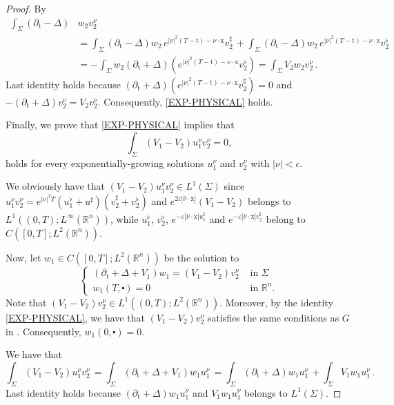 \documentclass[10pt,a4paper]{amsart}
\theoremstyle{remark}
\theoremstyle{definition}
\newcommand{\R}{\mathbb{R}}
\newcommand{\tm}{\mathrm{t}}
\newcommand{\x}{\mathrm{x}}
\begin{document}
\begin{proof}
By 
\begin{align*}
\int_{\Sigma}\left( \partial_{\tm}-\Delta\right)& w_{2} v_{2}^{\nu} \, \\
& = \int_{\Sigma}\left( \partial_{\tm}-\Delta\right) w_{2} \, e^{|\nu|^2 (T - \tm) - \nu \cdot \x} v_2^\sharp \, + \int_{\Sigma}\left( \partial_{\tm}-\Delta\right) w_{2} \, e^{|\nu|^2 (T - \tm) - \nu \cdot \x} v_2^\flat \, \\
& = - \int_{\Sigma} w_2 \left( \partial_{\tm}+\Delta\right)(e^{|\nu|^2 (T - \tm) - \nu \cdot \x} v_2^\flat) = \int_{\Sigma} V_{2} w_{2} v_{2}^{\nu} \, .
\end{align*}
Last identity holds because 
$\left( \partial_{\tm}+\Delta\right)(e^{|\nu|^2 (T - \tm) - \nu \cdot \x} v_2^\sharp) = 0$ and
$-\left( \partial_{\tm}+\Delta\right) v_2^\nu = V_2 v_2^\nu$. Consequently, \eqref{EXP-PHYSICAL} holds.

Finally, we prove that \eqref{EXP-PHYSICAL} implies that
\begin{equation}\label{EXP-EXP}
\int_{\Sigma}\left(V_{1}-V_{2}\right) u_{1}^{\nu} v_{2}^{\nu}=0,
\end{equation}
holds for every exponentially-growing solutions $u_1^\nu$ and $v_{2}^{\nu}$ with $|\nu| < c$.

We obviously have that $(V_1 - V_2) u^\nu_1 v_2^\nu \in L^1(\Sigma)$ since
$u^\nu_1 v_2^\nu = e^{|\nu|^2 T} (u^\flat_1 + u^\sharp) (v_2^\sharp + v_2^\flat)$ and
$ e^{2 \varepsilon |\hat \nu \cdot \x|} (V_1 - V_2)$
belongs to $L^1((0,T); L^\infty(\R^n))$, while $u_1^\flat$, $v_2^\flat$, 
$e^{-\varepsilon |\hat \nu \cdot \x| u_1^\sharp}$ and 
$e^{-\varepsilon |\hat \nu \cdot \x| v_2^\sharp}$ belong to
$C([0, T] ; L^{2}(\mathbb{R}^{n}))$.

Now, let $w_{1} \in C([0, T] ; L^{2}(\mathbb{R}^{n}))$ be the solution to 
$$
\begin{cases}\left( \partial_{\tm}+\Delta+V_{1}\right) w_{1}=\left(V_{1}-V_{2}\right)v_{2}^{\nu} & \text { in } \Sigma \\ w_{1}(T, \centerdot)=0 & \text { in } \mathbb{R}^{n}.\end{cases}
$$
Note that $(V_{1}-V_{2})v_2^\nu \in L^{1}((0, T) ; L^{2}(\mathbb{R}^{n}))$.  Moreover, by 
the identity \eqref{EXP-PHYSICAL},
we have that $(V_{1}-V_{2})v_2^\nu$ satisfies the same conditions as $G$ in 
. Consequently, $w_1(0, \centerdot)= 0$.

We have that
\[\int_{\Sigma}\left(V_{1}-V_{2}\right) u_{1}^\nu v_{2}^{\nu} \, = \int_{\Sigma}\left( \partial_{\tm}+\Delta+V_1\right) w_1 u_1^{\nu} \, = \int_{\Sigma}\left( \partial_{\tm}+\Delta\right) w_1 u_1^{\nu} \, + \int_{\Sigma} V_1 w_1 u_1^{\nu} \, .
\]
Last identity holds because $\left( \partial_{\tm}+\Delta\right) w_1 u_1^{\nu}$ and 
$V_1 w_1 u_1^{\nu}$ belongs to $L^1(\Sigma)$.


\end{proof}
\end{document}
